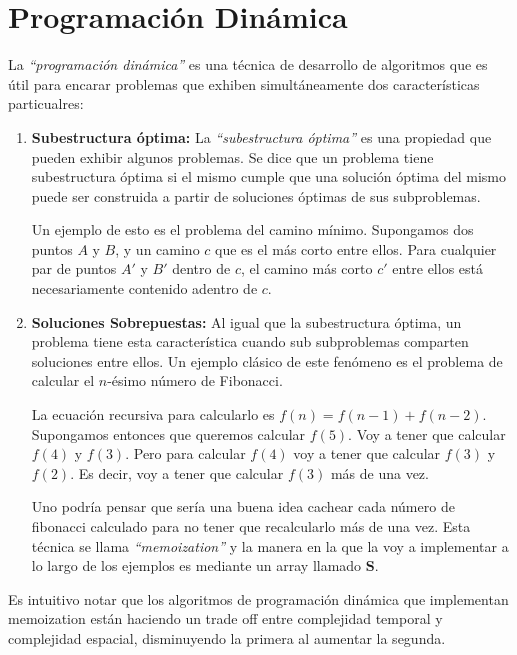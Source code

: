 \newpage
\section{Programaci\'on Din\'amica}

La \emph{``programaci\'on din\'amica''} es una t\'ecnica de desarrollo de algoritmos que es \'util para encarar problemas que exhiben simult\'aneamente dos caracter\'isticas particualres:

\begin{enumerate}
\item \textbf{Subestructura \'optima:} La \emph{``subestructura \'optima''} es una propiedad que pueden exhibir algunos problemas. Se dice que un problema tiene subestructura \'optima si el mismo cumple que una soluci\'on \'optima del mismo puede ser construida a partir de soluciones \'optimas de sus subproblemas.

Un ejemplo de esto es el problema del camino m\'inimo. Supongamos dos puntos $A$ y $B$, y un camino $c$ que es el m\'as corto entre ellos. Para cualquier par de puntos $A'$  y $B'$ dentro de $c$, el camino m\'as corto $c'$ entre ellos est\'a necesariamente contenido adentro de $c$.

\item \textbf{Soluciones Sobrepuestas:} Al igual que la subestructura \'optima, un problema tiene esta caracter\'istica cuando sub subproblemas comparten soluciones entre ellos. Un ejemplo cl\'asico de este fen\'omeno es el problema de calcular el $n$-\'esimo n\'umero de Fibonacci.

La ecuaci\'on recursiva para calcularlo es $f(n) = f(n-1) + f(n-2)$. Supongamos entonces que queremos calcular $f(5)$. Voy a tener que calcular $f(4)$ y $f(3)$. Pero para calcular $f(4)$ voy a tener que calcular $f(3)$ y $f(2)$. Es decir, voy a tener que calcular $f(3)$ m\'as de una vez.

Uno podr\'ia pensar que ser\'ia una buena idea cachear cada n\'umero de fibonacci calculado para no tener que recalcularlo m\'as de una vez. Esta t\'ecnica se llama \emph{``memoization''} y la manera en la que la voy a implementar a lo largo de los ejemplos es mediante un array llamado $\textbf{S}$.
\end{enumerate}

Es intuitivo notar que los algoritmos de programaci\'on din\'amica que implementan memoization est\'an haciendo un trade off entre complejidad temporal y complejidad espacial, disminuyendo la primera al aumentar la segunda.

